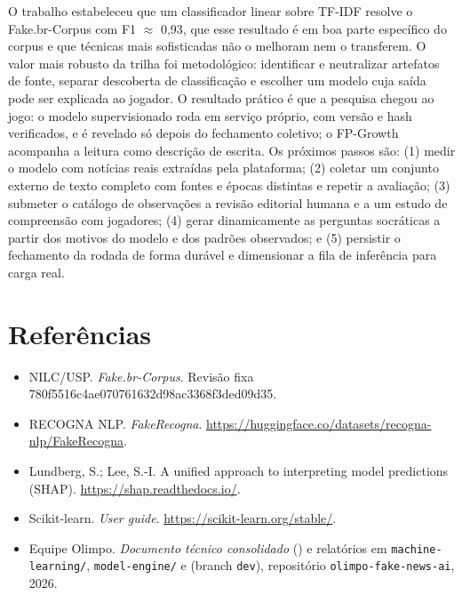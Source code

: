 \documentclass[brazilian,11pt,a4paper]{article}
\begin{document}
O trabalho estabeleceu que um classificador linear sobre TF-IDF resolve o Fake.br-Corpus com F1 $\approx$ 0,93, que esse resultado é em boa parte específico do corpus e que técnicas mais sofisticadas não o melhoram nem o transferem. O valor mais robusto da trilha foi metodológico: identificar e neutralizar artefatos de fonte, separar descoberta de classificação e escolher um modelo cuja saída pode ser explicada ao jogador. O resultado prático é que a pesquisa chegou ao jogo: o modelo supervisionado roda em serviço próprio, com versão e hash verificados, e é revelado só depois do fechamento coletivo; o FP-Growth acompanha a leitura como descrição de escrita. Os próximos passos são: (1) medir o modelo com notícias reais extraídas pela plataforma; (2) coletar um conjunto externo de texto completo com fontes e épocas distintas e repetir a avaliação; (3) submeter o catálogo de observações a revisão editorial humana e a um estudo de compreensão com jogadores; (4) gerar dinamicamente as perguntas socráticas a partir dos motivos do modelo e dos padrões observados; e (5) persistir o fechamento da rodada de forma durável e dimensionar a fila de inferência para carga real.

\section*{Referências}
\begin{itemize}[leftmargin=*,itemsep=1pt]
  \item NILC/USP. \textit{Fake.br-Corpus}. Revisão fixa 780f5516c4ae070761632d98ac3368f3ded09d35.
  \item RECOGNA NLP. \textit{FakeRecogna}. \url{https://huggingface.co/datasets/recogna-nlp/FakeRecogna}.
  \item Lundberg, S.; Lee, S.-I. A unified approach to interpreting model predictions (SHAP). \url{https://shap.readthedocs.io/}.
  \item Scikit-learn. \textit{User guide}. \url{https://scikit-learn.org/stable/}.
  \item Equipe Olimpo. \textit{Documento técnico consolidado} () e relatórios em \texttt{machine-learning/}, \texttt{model-engine/} e  (branch \texttt{dev}), repositório \texttt{olimpo-fake-news-ai}, 2026.
\end{itemize}
\end{document}
